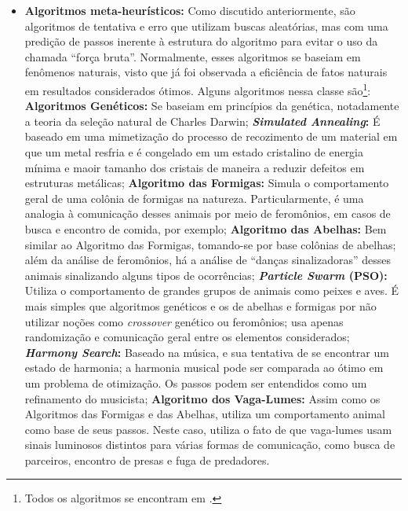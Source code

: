 \begin{itemize}
\item \textbf{Algoritmos meta-heur\'{i}sticos:} Como discutido anteriormente, s\~{a}o algoritmos de tentativa e erro que utilizam buscas aleat\'{o}rias, mas com uma predi\c{c}\~{a}o de passos inerente \`{a} estrutura do algoritmo para evitar o uso da chamada ``for\c{c}a bruta''. Normalmente, esses algoritmos se baseiam em fen\^{o}menos naturais, visto que j\'{a} foi observada a efici\^{e}ncia de fatos naturais em resultados considerados \'{o}timos. Alguns algoritmos nessa classe s\~{a}o\footnote{Todos os algoritmos se encontram em \cite[pp. 173-229]{yang}.}:
\subitem \textbf{Algoritmos Gen\'{e}ticos:} Se baseiam em princ\'{i}pios da gen\'{e}tica, notadamente a teoria da sele\c{c}\~{a}o natural de Charles Darwin;
\subitem \textbf{\textit{Simulated Annealing}:} \'{E} baseado em uma mimetiza\c{c}\~{a}o do processo de recozimento de um material em que um metal resfria e \'{e} congelado em um estado cristalino de energia m\'{i}nima e maoir tamanho dos cristais de maneira a reduzir defeitos em estruturas met\'{a}licas;
\subitem \textbf{Algoritmo das Formigas:} Simula o comportamento geral de uma col\^{o}nia de formigas na natureza. Particularmente, \'{e} uma analogia \`{a} comunica\c{c}\~{a}o desses animais por meio de ferom\^{o}nios, em casos de busca e encontro de comida, por exemplo;
\subitem \textbf{Algoritmo das Abelhas:} Bem similar ao Algoritmo das Formigas, tomando-se por base col\^{o}nias de abelhas; al\'{e}m da an\'{a}lise de ferom\^{o}nios, h\'{a} a an\'{a}lise de ``dan\c{c}as sinalizadoras'' desses animais sinalizando alguns tipos de ocorr\^{e}ncias;
\subitem \textbf{\textit{Particle Swarm} (PSO):} Utiliza o comportamento de grandes grupos de animais como peixes e aves. \'{E} mais simples que algoritmos gen\'{e}ticos e os de abelhas e formigas por n\~{a}o utilizar no\c{c}\~{o}es como \textit{crossover} gen\'{e}tico ou ferom\^{o}nios; usa apenas randomiza\c{c}\~{a}o e comunica\c{c}\~{a}o geral entre os elementos considerados;
\subitem \textbf{\textit{Harmony Search}:} Baseado na m\'{u}sica, e sua tentativa de se encontrar um estado de harmonia; a harmonia musical pode ser comparada ao \'{o}timo em um problema de otimiza\c{c}\~{a}o. Os passos podem ser entendidos como um refinamento do musicista;
\subitem \textbf{Algoritmo dos Vaga-Lumes:} Assim como os Algoritmos das Formigas e das Abelhas, utiliza um comportamento animal como base de seus passos. Neste caso, utiliza o fato de que vaga-lumes usam sinais luminosos distintos para v\'{a}rias formas de comunica\c{c}\~{a}o, como busca de parceiros, encontro de presas e fuga de predadores.

\end{itemize}

